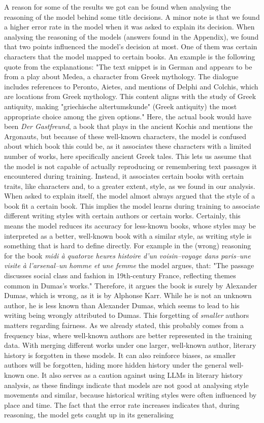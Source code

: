 \documentclass[11pt]{article}
\begin{document}
A reason for some of the results we got can be found when analysing the reasoning of the model behind some title decisions. A minor note is that we found a higher error rate in the model when it was asked to explain its decision. When analysing the reasoning of the models (answers found in the Appendix), we found that two points influenced the model's decision at most. One of them was certain characters that the model mapped to certain books. An example is the following quote from the explanations: "The text snippet is in German and appears to be from a play about Medea, a character from Greek mythology. The dialogue includes references to Peronto, Aietes, and mentions of Delphi and Colchis, which are locations from Greek mythology. This content aligns with the study of Greek antiquity, making "griechische altertumskunde" (Greek antiquity) the most appropriate choice among the given options." Here, the actual book would have been \textit{Der Gastfreund}, a book that plays in the ancient Kochis and mentions the Argonauts, but because of these well-known characters, the model is confused about which book this could be, as it associates these characters with a limited number of works, here specifically ancient Greek tales. This lets us assume that the model is not capable of actually reproducing or remembering text passages it encountered during training. Instead, it associates certain books with certain traits, like characters and, to a greater extent, style, as we found in our analysis. When asked to explain itself, the model almost always argued that the style of a book fit a certain book. This implies the model learns during training to associate different writing styles with certain authors or certain works. Certainly, this means the model reduces its accuracy for less-known books, whose styles may be interpreted as a better, well-known book with a similar style, as writing style is something that is hard to define directly. For example in the (wrong) reasoning for the book \textit{midi à quatorze heures histoire d'un voisin--voyage dans paris--une visite à l'arsenal--un homme et une femme} the model argues, that: "The passage discusses social class and fashion in 19th-century France, reflecting themes common in Dumas's works." Therefore, it argues the book is surely by Alexander Dumas, which is wrong, as it is by Alphonse Karr. While he is not an unknown author, he is less known than Alexander Dumas, which seems to lead to his writing being wrongly attributed to Dumas. This forgetting of \textit{smaller} authors matters regarding fairness. As we already stated, this probably comes from a frequency bias, where well-known authors are better represented in the training data. With merging different works under one larger, well-known author, literary history is forgotten in these models. It can also reinforce biases, as smaller authors will be forgotten, hiding more hidden history under the general well-known one. It also serves as a caution against using LLMs in literary history analysis, as these findings indicate that models are not good at analysing style movements and similar, because historical writing styles were often influenced by place and time. The fact that the error rate increases indicates that, during reasoning, the model gets caught up in its generalising 
\end{document}
